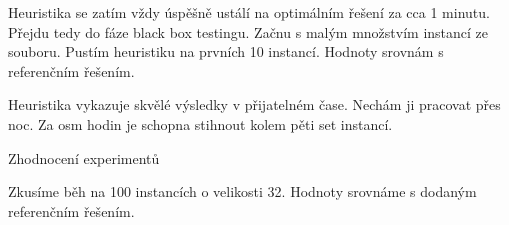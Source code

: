 \bigskip
\centerline{}\bigskip

Heuristika se zatím vždy úspěšně ustálí na optimálním řešení za cca 1 minutu. Přejdu tedy do fáze black box testingu. Začnu s malým množstvím instancí ze souboru. Pustím heuristiku na prvních 10 instancí. Hodnoty srovnám s referenčním řešením.

\bigskip
\centerline{}\bigskip

Heuristika vykazuje skvělé výsledky v přijatelném čase. Nechám ji pracovat přes noc. Za osm hodin je schopna stihnout kolem pěti set instancí.






















\vfill\break
\sec Zhodnocení experimentů


Zkusíme běh na 100 instancích o velikosti 32. Hodnoty srovnáme s dodaným referenčním řešením.

